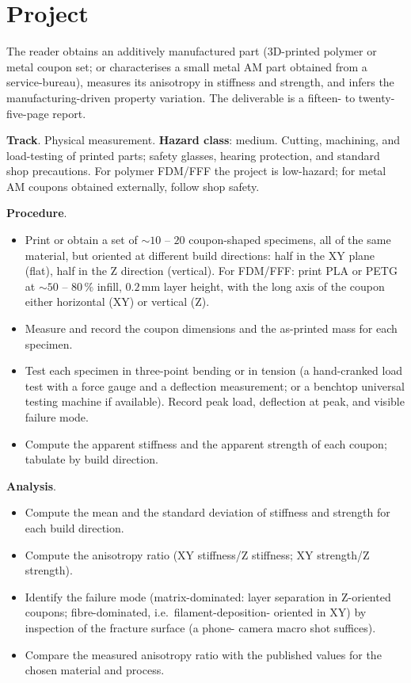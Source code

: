 \section{Project}

\begin{project}
The reader obtains an additively manufactured part (3D-printed
polymer or metal coupon set; or characterises a small metal AM part
obtained from a service-bureau), measures its anisotropy in stiffness
and strength, and infers the manufacturing-driven property variation.
The deliverable is a fifteen- to twenty-five-page report.

\textbf{Track}. Physical measurement.
\textbf{Hazard class}: medium. Cutting, machining, and load-testing
of printed parts; safety glasses, hearing protection, and standard
shop precautions. For polymer FDM/FFF the project is low-hazard; for
metal AM coupons obtained externally, follow shop safety.

\textbf{Procedure}.

\begin{itemize}[leftmargin=*]
\item Print or obtain a set of $\sim 10$ -- $20$ coupon-shaped
  specimens, all of the same material, but oriented at different
  build directions: half in the XY plane (flat), half in the Z
  direction (vertical). For FDM/FFF: print PLA or PETG at $\sim 50$
  -- $80\,\%$ infill, $0.2\,\text{mm}$ layer height, with the long
  axis of the coupon either horizontal (XY) or vertical (Z).
\item Measure and record the coupon dimensions and the as-printed
  mass for each specimen.
\item Test each specimen in three-point bending or in tension (a
  hand-cranked load test with a force gauge and a deflection
  measurement; or a benchtop universal testing machine if available).
  Record peak load, deflection at peak, and visible failure mode.
\item Compute the apparent stiffness and the apparent strength of
  each coupon; tabulate by build direction.
\end{itemize}

\textbf{Analysis}.

\begin{itemize}[leftmargin=*]
\item Compute the mean and the standard deviation of stiffness and
  strength for each build direction.
\item Compute the anisotropy ratio (XY stiffness/Z stiffness; XY
  strength/Z strength).
\item Identify the failure mode (matrix-dominated: layer separation
  in Z-oriented coupons; fibre-dominated, i.e.\ filament-deposition-
  oriented in XY) by inspection of the fracture surface (a phone-
  camera macro shot suffices).
\item Compare the measured anisotropy ratio with the published values
  for the chosen material and process.
\end{itemize}


\end{project}
